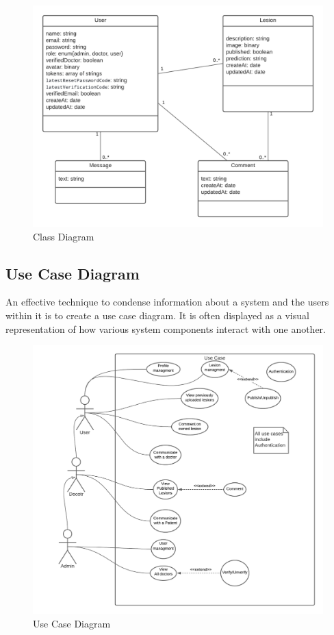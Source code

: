 \begin{figure}[H]
\begin{center}
\includegraphics[width=12cm]{./diagnosis-system/conception/class.png}
\end{center}
\caption{Class Diagram}
\label{fig:}
\end{figure}



\subsection{Use Case Diagram}
An effective technique to condense information about a system and the users within it is to create a use case diagram. It is often displayed as a visual representation of how various system components interact with one another.


\begin{figure}[H]
\begin{center}
\includegraphics[width=18cm]{./diagnosis-system/conception/use-case.png}
\end{center}
\caption{Use Case Diagram}
\label{fig:}
\end{figure}



